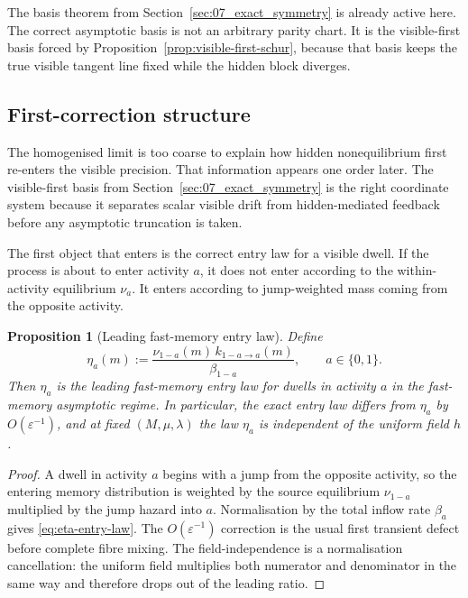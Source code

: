 \documentclass[11pt]{article}
\numberwithin{equation}{section}
\newcommand{\eps}{\varepsilon}
\theoremstyle{thmcompact}
\newtheorem{proposition}[theorem]{Proposition}
\theoremstyle{remark}
\begin{document}
The basis theorem from Section~\ref{sec:07_exact_symmetry} is already active here. The correct asymptotic basis is not an arbitrary parity chart. It is the visible-first basis forced by Proposition~\ref{prop:visible-first-schur}, because that basis keeps the true visible tangent line fixed while the hidden block diverges.

\subsection{First-correction structure}

The homogenised limit is too coarse to explain how hidden nonequilibrium first re-enters the visible precision. That information appears one order later. The visible-first basis from Section~\ref{sec:07_exact_symmetry} is the right coordinate system because it separates scalar visible drift from hidden-mediated feedback before any asymptotic truncation is taken.

The first object that enters is the correct entry law for a visible dwell. If the process is about to enter activity $a$, it does not enter according to the within-activity equilibrium $\nu_a$. It enters according to jump-weighted mass coming from the opposite activity.

\begin{proposition}[Leading fast-memory entry law]\label{prop:fast-memory-entry-law}
Define
\begin{equation}\label{eq:eta-entry-law}
\eta_a(m):=\frac{\nu_{1-a}(m)\,k_{1-a\to a}(m)}{\beta_{1-a}},
\qquad a\in\{0,1\}.
\end{equation}
Then $\eta_a$ is the leading fast-memory entry law for dwells in activity $a$ in the fast-memory asymptotic regime. In particular, the exact entry law differs from $\eta_a$ by $O(\eps^{-1})$, and at fixed $(M,\mu,\lambda)$ the law $\eta_a$ is independent of the uniform field $h$.
\end{proposition}

\begin{proof}
A dwell in activity $a$ begins with a jump from the opposite activity, so the entering memory distribution is weighted by the source equilibrium $\nu_{1-a}$ multiplied by the jump hazard into $a$. Normalisation by the total inflow rate $\beta_a$ gives \eqref{eq:eta-entry-law}. The $O(\eps^{-1})$ correction is the usual first transient defect before complete fibre mixing. The field-independence is a normalisation cancellation: the uniform field multiplies both numerator and denominator in the same way and therefore drops out of the leading ratio.
\end{proof}
\end{document}

